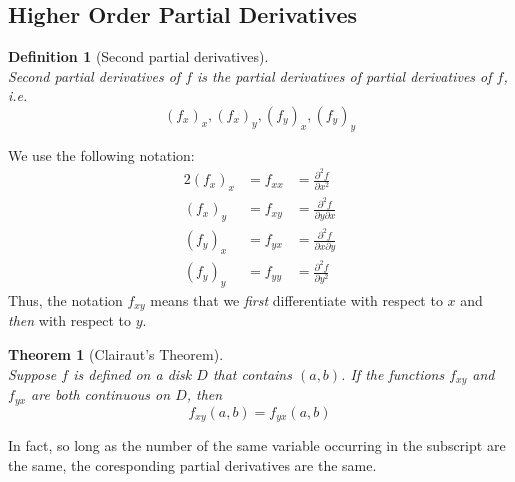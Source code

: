 \documentclass[12pt]{article}
\newtheorem{definition}{Definition}[section]
\newtheorem{theorem}{Theorem}[section]
\theoremstyle{definition}
\begin{document}
\subsection{Higher Order Partial Derivatives}
\begin{definition}[Second partial derivatives]
\hfill\\\normalfont Second partial derivatives of $f$ is the partial derivatives of partial derivatives of $f$, i.e.
\[
(f_x)_x,(f_x)_y,(f_y)_x,(f_y)_y
\]
\end{definition}
We use the following notation:
\begin{alignat*}{2}
(f_x)_x&=f_{xx}&=\frac{\partial^2 f}{\partial x^2}\\
(f_x)_y&=f_{xy}&=\frac{\partial^2 f}{\partial y\partial x}\\
(f_y)_x&=f_{yx}&=\frac{\partial^2 f}{\partial x\partial y}\\
(f_y)_y&=f_{yy}&=\frac{\partial^2 f}{\partial y^2}
\end{alignat*}
Thus, the notation $f_{xy}$ means that we \textit{first} differentiate with respect to $x$ and \textit{then} with respect to $y$.
\begin{theorem}[Clairaut's Theorem]
\hfill\\\normalfont Suppose $f$ is defined on a disk $D$ that contains $(a,b)$. If the functions $f_{xy}$ and $f_{yx}$ are both \textit{continuous} on $D$, then
\[
f_{xy}(a,b)=f_{yx}(a,b)
\]
\end{theorem}
In fact, so long as the number of the same variable occurring in the subscript are the same, the coresponding partial derivatives are the same.
\end{document}
